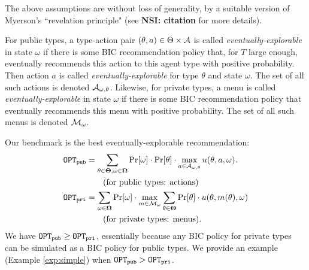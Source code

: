 \noindent The above assumptions are without loss of generality, by a suitable version of Myerson's ``revelation principle" (see {\bf NSI: citation} for more details).

\iffalse
For reported types and private types, we assume that the message in each round is a \emph{menu} a mapping types to actions, and assume that the recommendation policy satisfies a similar but technically different BIC condition. Again, this is without loss of generality by revelation principle. to state the BIC condition, let $\pi^t$ be the menu recommended in round $t$. The recommendation policy $\pi$ is BIC if for each round $t$, type $\theta$, and any two menus $m,m'$ such that
    $\Pr[\pi^t= m|\EE_{t-1}] > 0$, we have
\begin{align}\label{eq:model-BIC-menus}
\E\left[\; u(\theta,m(\theta),\omega) - u(\theta,m'(\theta),\omega)
    \mid \pi^t = m, \EE_{t-1}\;\right] \geq 0.
\end{align}
(Again, the expectation is over the realized state $\omega$ and the randomness in the policy.)
\fi

For public types, a type-action pair $(\theta,a)\in \Theta\times \mathcal{A}$ is called \emph{eventually-explorable} in state $\omega$ if there is some BIC recommendation policy that, for $T$ large enough, eventually recommends this action to this agent type with positive probability. Then action $a$ is called \emph{eventually-explorable} for type $\theta$ and state $\omega$. The set of all such actions is denoted $\mathcal{A}_{\omega,\theta}$. Likewise, for private types, a menu is called \emph{eventually-explorable} in state $\omega$ if there is some BIC recommendation policy that eventually recommends this menu with positive probability. The set of all such menus is denoted $\mathcal{M}_{\omega}$.

Our benchmark is the best eventually-explorable recommendation:
\begin{align*}
\mathtt{OPT}_{\mathtt{pub}} &= \sum_{\theta \in \bold{\Theta}, \omega\in \bold{\Omega}} \Pr[\omega] \cdot \Pr[\theta] \cdot \max_{a \in \mathcal{A}_{\omega,\theta}} u(\theta, a, \omega).\\
    &\qquad\text{(for public types: actions)}\\
\mathtt{OPT}_{\mathtt{pri}} &= \sum_{\omega\in \bold{\Omega}} \Pr[\omega] \cdot\max_{m \in \mathcal{M}_{\omega}}\sum_{\theta \in \bold{\Theta}} \Pr[\theta] \cdot  u(\theta, m(\theta), \omega)\\
&\qquad\text{(for private types: menus)}.
\end{align*}
We have $\mathtt{OPT}_{\mathtt{pub}} \geq \mathtt{OPT}_{\mathtt{pri}}$, essentially because any BIC policy for private types can be simulated as a BIC policy for public types. We provide an example (Example \ref{exp:simple}) when $\mathtt{OPT}_{\mathtt{pub}} > \mathtt{OPT}_{\mathtt{pri}}$.

